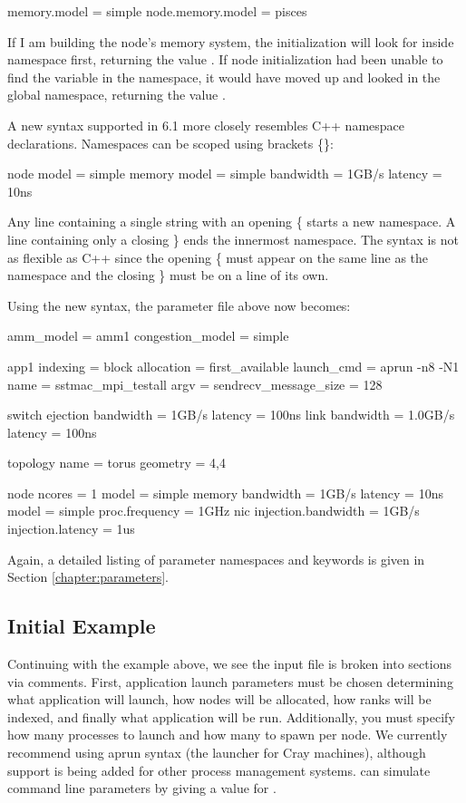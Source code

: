\begin{ViFile}
memory.model = simple
node.memory.model = pisces
\end{ViFile}
If I am building the node's memory system, the initialization will look for  inside namespace  first, returning the value .
If node initialization had been unable to find the variable in the  namespace,
it would have moved up and looked in the global namespace, returning the value .

A new syntax supported in 6.1 more closely resembles C++ namespace declarations. 
Namespaces can be scoped using brackets \{\}:

\begin{ViFile}
node {
 model = simple
 memory {
   model = simple
   bandwidth = 1GB/s
   latency = 10ns
 }
}
\end{ViFile}
Any line containing a single string with an opening \{ starts a new namespace.
A line containing only a closing \} ends the innermost namespace.
The syntax is not as flexible as C++ since the opening \{ must appear on the same line as the namespace and the closing \} must be on a line of its own.

Using the new syntax, the parameter file above now becomes:

\begin{ViFile}
amm_model = amm1
congestion_model = simple

app1 {
 indexing = block
 allocation = first_available
 launch_cmd = aprun -n8 -N1
 name = sstmac_mpi_testall
 argv =
 sendrecv_message_size = 128
}

switch {
 ejection {
  bandwidth = 1GB/s
  latency = 100ns
 }
 link {
  bandwidth = 1.0GB/s
  latency = 100ns
 }
}

topology {
 name = torus
 geometry = 4,4
}

node {
 ncores = 1
 model = simple
 memory {
  bandwidth = 1GB/s
  latency = 10ns
  model = simple
 }
 proc.frequency = 1GHz
 nic {
  injection.bandwidth = 1GB/s
  injection.latency = 1us
 }
}
\end{ViFile}
Again, a detailed listing of parameter namespaces and keywords is given in Section \ref{chapter:parameters}.

\subsection{Initial Example}
Continuing with the example above, we see the input file is broken into sections via comments.  
First, application launch parameters must be chosen determining what application will launch, 
how nodes will be allocated, how ranks will be indexed, and finally what application will be run.  
Additionally, you must specify how many processes to launch and how many to spawn per node.  
We currently recommend using aprun syntax (the launcher for Cray machines), 
although support is being added for other process management systems.
\sstmacro can simulate command line parameters by giving a value for .

